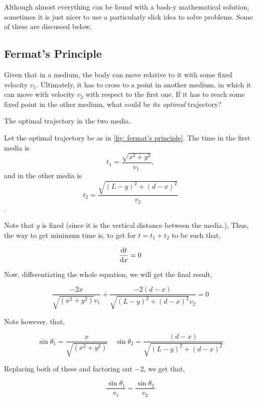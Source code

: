 Although almost everything can be found with a bash-y mathematical solution, sometimes 
it is just nicer to use a particularly slick idea to solve problems. Some of these are discussed 
below.

\subsection{Fermat's Principle}

Given that in a medium, the body can move relative to it with some fixed 
velocity \(v_1\). Ultimately, it has to cross to a point in another medium, in which 
it can move with velocity \(v_2\) with respect to the first one. If it has to reach 
some fixed point in the other medium, what could be its \emph{optimal} trajectory?

\begin{marginfigure}
    \centering
    \caption{The optimal trajectory in the two media.}
    \label{fig: fermat's principle}
\end{marginfigure}

Let the optimal trajectory be as in \cref{fig: fermat's principle}. The time in the first media
is \[t_1 = \frac{\sqrt{x^2 + y^2}}{v_1},\] and in the other media is \[t_2 = \frac{\sqrt{(L-y)^2 + (d-x)^2}}{v_2}\].

Note that \(y\) is fixed (since it is the vertical distance between the media.), Thus, 
the way to get minimum time is, to get for \(t = t_1 + t_2\) to be such that,

\begin{equation*}
    \dv{t}{x} = 0
\end{equation*}

Now, differentiating the whole equation, we will get the final result,

\begin{equation}
    \frac{-2x}{\sqrt{(x^2+y^2)}v_1} + \frac{-2(d-x)}{\sqrt{(L-y)^2 + (d-x)^2}v_2} = 0 
\end{equation}

Note however, that, 

\begin{equation*}
    \sin\theta_1 = \frac{x}{\sqrt{(x^2+y^2)}} \quad \sin\theta_2 = \frac{(d-x)}{\sqrt{(L-y)^2 + (d-x)^2}}
\end{equation*}

Replacing both of these and factoring out \(-2\), we get that, 

\begin{equation}
    \boxed{\frac{\sin\theta_1}{v_1} = \frac{\sin\theta_2}{v_2}}
\end{equation}

